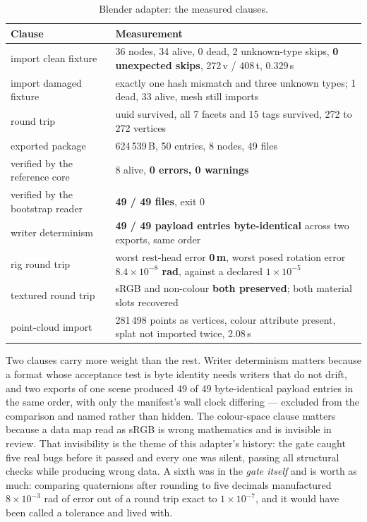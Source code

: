 \documentclass[10pt,twocolumn,letterpaper]{article}
\begin{document}
\begin{table}[t]\centering\footnotesize
\caption{Blender adapter: the measured clauses.}
\begin{tabular}{@{}L{2.9cm} L{4.4cm}@{}}
\toprule
Clause & Measurement \\
\midrule
import clean fixture & 36 nodes, 34 alive, 0 dead, 2 unknown-type skips, \textbf{0 unexpected skips}, 272\,v / 408\,t, 0.329\,s \\
import damaged fixture & exactly one hash mismatch and three unknown types; 1 dead, 33 alive, mesh still imports \\
round trip & uuid survived, all 7 facets and 15 tags survived, 272 to 272 vertices \\
exported package & 624\,539\,B, 50 entries, 8 nodes, 49 files \\
verified by the reference core & 8 alive, \textbf{0 errors, 0 warnings} \\
verified by the bootstrap reader & \textbf{49 / 49 files}, exit 0 \\
writer determinism & \textbf{49 / 49 payload entries byte-identical} across two exports, same order \\
rig round trip & worst rest-head error \textbf{0\,m}, worst posed rotation error \textbf{$8.4\times10^{-8}$ rad}, against a declared $1\times10^{-5}$ \\
textured round trip & sRGB and non-colour \textbf{both preserved}; both material slots recovered \\
point-cloud import & 281\,498 points as vertices, colour attribute present, splat not imported twice, 2.08\,s \\
\bottomrule
\end{tabular}
\end{table}

Two clauses carry more weight than the rest. Writer determinism matters because a format whose acceptance test is byte identity needs writers that do not drift, and two exports of one scene produced 49 of 49 byte-identical payload entries in the same order, with only the manifest's wall clock differing --- excluded from the comparison and named rather than hidden. The colour-space clause matters because a data map read as sRGB is wrong mathematics and is invisible in review. That invisibility is the theme of this adapter's history: the gate caught five real bugs before it passed and every one was silent, passing all structural checks while producing wrong data. A sixth was in the \emph{gate itself} and is worth as much: comparing quaternions after rounding to five decimals manufactured $8\times10^{-3}$ rad of error out of a round trip exact to $1\times10^{-7}$, and it would have been called a tolerance and lived with.
\end{document}
